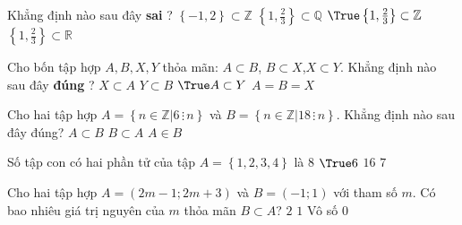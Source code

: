 \begin{ex}%
	Khẳng định  nào sau đây \textbf{sai} ?
	 \choice
		{$ \left\{-1,2\right\} \subset \mathbb{Z} $} 
		{$ \left\{1,\frac{2}{3}\right\} \subset \mathbb{Q}  $}
		{$ \True  \left\{1,\frac{2}{3}\right\} \subset \mathbb{Z} $}
		{$  \left\{1,\frac{2}{3}\right\} \subset \mathbb{R} $}
\end{ex}

\begin{ex}%
	Cho bốn tập hợp $ A,B,X,Y $ thỏa mãn: $ A \subset B $, $ B \subset X  $,$ X \subset Y $. Khẳng định nào sau đây \textbf{đúng} ?
	 \choice
		{$ X  \subset A $}
		{$ Y \subset B $} 
		{$ \True A  \subset Y $ }
		{$ A = B = X  $}
\end{ex}

\begin{ex}%
	Cho hai tập hợp $A = \left\{n \in \mathbb{Z}\big|  6\, \vdots\, n\right\}$ và $B = \left\{n \in \mathbb{Z}\big| 18\, \vdots\, n\right\}$. Khẳng định nào sau đây đúng?
		{\True $A \subset  B$}
		{$B \subset  A$}
		{$A \in  B$}
\end{ex}

\begin{ex}%
	Số tập con  có hai phần tử của tập $ A = \left\{1,2,3,4\right\} $ là
	 \choice
		 {$ 8 $}
		{$ \True  6 $}
		{$ 16  $}
		{$  7 $}
\end{ex}

\begin{ex}%
	Cho hai tập hợp $A=(2m-1;2m+3)$ và  $B=(-1;1)$ với tham số $m$. Có bao nhiêu giá trị nguyên của $m$ thỏa mãn $B\subset A$?
	 \choice
		{\True $2$} 
		 {$1$}
		{Vô  số}
		 {$0$}
\end{ex}

